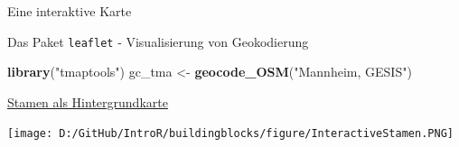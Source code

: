 \documentclass[ignorenonframetext,]{beamer}
\newenvironment{Shaded}{\begin{snugshade}}{\end{snugshade}}
\newcommand{\DataTypeTok}[1]{\textcolor[rgb]{0.74,0.68,0.62}{\underline{#1}}}
\newcommand{\FloatTok}[1]{\textcolor[rgb]{0.27,0.67,0.26}{#1}}
\newcommand{\KeywordTok}[1]{\textcolor[rgb]{0.26,0.66,0.93}{\textbf{#1}}}
\newcommand{\NormalTok}[1]{\textcolor[rgb]{0.74,0.68,0.62}{#1}}
\newcommand{\OperatorTok}[1]{\textcolor[rgb]{0.74,0.68,0.62}{#1}}
\newcommand{\StringTok}[1]{\textcolor[rgb]{0.02,0.61,0.04}{#1}}
\begin{document}
\begin{frame}[fragile]{Eine interaktive Karte}
\protect\hypertarget{eine-interaktive-karte}{}

\begin{Shaded}
\end{Shaded}

\end{frame}

\begin{frame}[fragile]{Das Paket \texttt{leaflet} - Visualisierung von
Geokodierung}
\protect\hypertarget{das-paket-leaflet---visualisierung-von-geokodierung}{}

\begin{Shaded}
\begin{Highlighting}[]
\KeywordTok{library}\NormalTok{(}\StringTok{"tmaptools"}\NormalTok{)}
\NormalTok{gc_tma <-}\StringTok{ }\KeywordTok{geocode_OSM}\NormalTok{(}\StringTok{"Mannheim, GESIS"}\NormalTok{)}
\end{Highlighting}
\end{Shaded}

\begin{Shaded}
\end{Shaded}

\end{frame}

\begin{frame}[fragile]{\href{https://rstudio.github.io/leaflet/basemaps.html}{Stamen
als Hintergrundkarte}}
\protect\hypertarget{stamen-als-hintergrundkarte}{}

\begin{Shaded}
\end{Shaded}

\texttt{[image: D:/GitHub/IntroR/buildingblocks/figure/InteractiveStamen.PNG]}

\end{frame}
\end{document}
